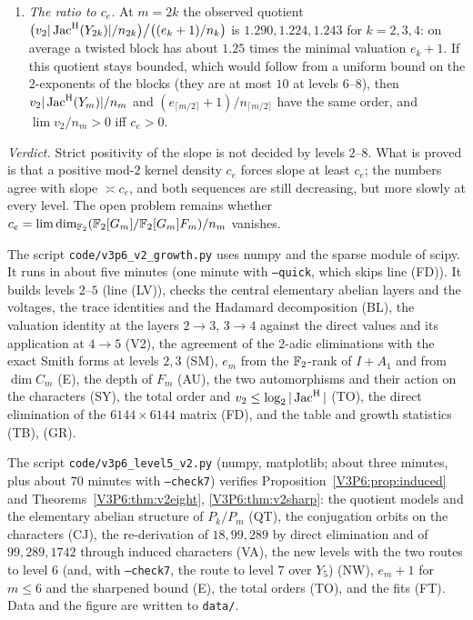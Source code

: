 \begin{remark}
\begin{enumerate}
$0.236,0.188,0.162$.
\item[(d)] \emph{The ratio to $c_e$.} At $m=2k$ the observed quotient
$\bigl(v_2|\operatorname{Jac}^{\mathrm{H}}(Y_{2k})|/n_{2k}\bigr)\big/\bigl((e_k+1)/n_k\bigr)$ is $1.290,1.224,1.243$ for
$k=2,3,4$: on average a twisted block has about $1.25$ times the minimal valuation $e_k+1$. If this
quotient stays bounded, which would follow from a uniform bound on the $2$-exponents of the blocks
(they are at most $10$ at levels $6$--$8$), then $v_2|\operatorname{Jac}^{\mathrm{H}}(Y_m)|/n_m$ and $(e_{\lceil m/2\rceil}+1)/n_{\lceil m/2\rceil}$ have the same
order, and $\lim v_2/n_m>0$ iff $c_e>0$.
\end{enumerate}
\emph{Verdict.} Strict positivity of the slope is not decided by levels $2$--$8$. What is proved is
that a positive mod-$2$ kernel density $c_e$ forces slope at least $c_e$; the numbers agree with
slope $\asymp c_e$, and both sequences are still decreasing, but more slowly at every level.
The open problem remains whether $c_e=\lim\dim_{\mathbb{F}_2}(\mathbb{F}_2[G_m]/\mathbb{F}_2[G_m]F_m)/n_m$ vanishes.
\end{remark}

\begin{remark}[Verification]\label{V3P6:rem:v2code}
The script \texttt{code/v3p6\_v2\_growth.py} uses numpy and the sparse module of scipy. It runs
in about five minutes (one minute with \texttt{--quick}, which skips line (FD)). It builds
levels $2$--$5$ (line (LV)), checks
the central elementary abelian layers and the voltages, the trace identities and the Hadamard
decomposition (BL), the valuation identity at the layers $2\to3$, $3\to4$ against the direct
values and its application at $4\to5$ (V2), the agreement of the $2$-adic eliminations with the
exact Smith forms at levels $2,3$ (SM), $e_m$ from the $\mathbb{F}_2$-rank of $I+A_1$ and from
$\dim C_m$ (E), the depth of $F_m$ (AU), the two automorphisms and their action on the
characters (SY), the total order and $v_2\le\log_2|\operatorname{Jac}^{\mathrm{H}}|$ (TO), the direct elimination of the
$6144\times6144$ matrix (FD), and the table and growth statistics (TB), (GR).

The script \texttt{code/v3p6\_level5\_v2.py} (numpy, matplotlib; about three minutes, plus about
$70$ minutes with \texttt{--check7}) verifies Proposition~\ref{V3P6:prop:induced} and
Theorems~\ref{V3P6:thm:v2eight}, \ref{V3P6:thm:v2sharp}: the quotient models and the
elementary abelian structure of $P_k/P_m$ (QT), the conjugation orbits on the characters (CJ), the
re-derivation of $18,99,289$ by direct elimination and of $99,289,1742$ through induced characters
(VA), the new levels with the two routes to level $6$ (and, with \texttt{--check7}, the route to
level $7$ over $Y_5$) (NW), $e_m+1$ for $m\le6$ and the sharpened bound (E), the total orders (TO),
and the fits (FT). Data and the figure are written to \texttt{data/}.
\end{remark}
